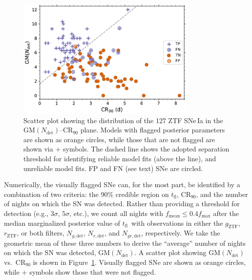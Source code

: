 \documentclass[twocolumn]{./aastex63}
\newcommand{\rztf}{$r_\mathrm{ZTF}$}
\newcommand{\gztf}{$g_\mathrm{ZTF}$}
\newcommand{\tfl}{$t_\mathrm{fl}$}
\begin{document}
\begin{figure}
    \centering
    \includegraphics[width=3.5in]{./figures/final_sample.pdf}
    \caption{Scatter plot showing the distribution of the 127 ZTF SNe\,Ia in
    the $\mathrm{GM}(N_\mathrm{det})$--$\mathrm{CR}_{90}$ plane. Models with
    flagged posterior parameters are shown as orange circles, while those
    that are not flagged are shown via $+$ symbols. The dashed line shows the
    adopted separation threshold for identifying reliable model fits (above
    the line), and unreliable model fits. FP and FN (see text) SNe are
    circled. }
    \label{fig:flagged_sn}
\end{figure}

Numerically, the visually flagged SNe can, for the most part, be identified
by a combination of two criteria: the 90\% credible region on \tfl,
$\mathrm{CR}_{90}$, and the number of nights on which the SN was detected.
Rather than providing a threshold for detection (e.g., $3\sigma$, $5\sigma$,
etc.), we count all nights with $f_\mathrm{mean} \le 0.4 f_\mathrm{max}$
after the median marginalized posterior value of \tfl\ with observations in
either the \gztf, \rztf, or both filters, $N_{g, \mathrm{det}}$, $N_{r,
\mathrm{det}}$, and $N_{gr, \mathrm{det}}$, respectively. We take the
geometric mean of these three numbers to derive the ``average'' number of
nights on which the SN was detected, $\mathrm{GM}(N_\mathrm{det})$. A scatter
plot showing $\mathrm{GM}(N_\mathrm{det})$ vs.\ $\mathrm{CR}_{90}$ is shown
in Figure~\ref{fig:flagged_sn}. Visually flagged SNe are shown as orange
circles, while $+$ symbols show those that were not flagged.
\end{document}
